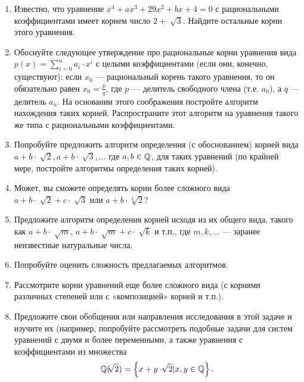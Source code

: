 \begin{enumerate}
\item Известно, что уравнение $x^4+ax^3+29x^2+bx+4=0$ с рациональными коэффициентами имеет корнем число $2+\sqrt[] 3 $. Найдите остальные корни этого уравнения.
\item Обоснуйте следующее утверждение про рациональные корни уравнения вида $p(x)=\sum_{i=0}^n a_i \cdot x^i$ с целыми коэффициентами (если они, конечно, существуют): если $x_0$ — рациональный корень такого уравнения, то он обязательно равен $x_0={\frac{p}{q}}$, где $p$ — делитель свободного члена (т.е. $a_0$), а $q$ — делитель $a_n$. На основании этого соображения постройте алгоритм нахождения таких корней. Распространите этот алгоритм на уравнения такого же типа с рациональными коэффициентами.
\item Попробуйте предложить алгоритм определения (с обоснованием) корней вида $a+b\cdot \sqrt[] 2, a+b\cdot \sqrt[] 3,\dots$ где $a, b \in \mathbb{Q}$, для таких уравнений (по крайней мере, постройте алгоритмы определения таких корней).
\item Может, вы сможете определять корни более сложного вида $a+b\cdot \sqrt[]2 +c\cdot \sqrt[] 3$ или $a+b\cdot \sqrt[3] 2$?
\item Предложите алгоритм определения корней исходя из их общего вида, такого как $a+b \cdot \sqrt[] m$, $a+b\cdot \sqrt[] m + c\cdot \sqrt[] k$ и т.п., где $m, k,\dots$ — заранее неизвестные натуральные числа.
\item Попробуйте оценить сложность предлагаемых алгоритмов.
\item Рассмотрите корни уравнений еще более сложного вида (с корнями различных степеней или с «композицией» корней и т.п.).
\item Предложите свои обобщения или направления исследования в этой задаче и изучите их (например, попробуйте рассмотреть подобные задачи для систем уравнений с двумя и более переменными, а также уравнения с коэффициентами из множества
$$\mathbb{Q}(\sqrt[]2) = \left\{x+y \cdot \sqrt[]2|x,y \in \mathbb{Q} \right\}.$$
\end{enumerate}


